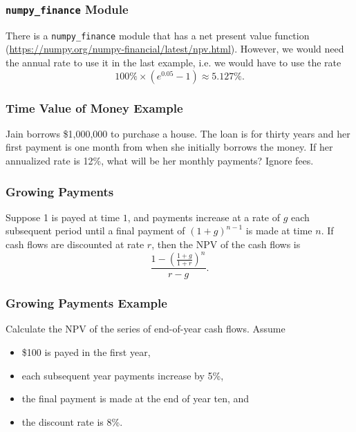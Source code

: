 \documentclass{beamer}
\begin{document}
\begin{frame}
\frametitle{\texttt{numpy\_finance} Module}

There is a \texttt{numpy\_finance} module that has a net present value function (\url{https://numpy.org/numpy-financial/latest/npv.html}). However, we would need the annual rate to use it in the last example, i.e. we would have to use the rate 
$$
100\% \times (e^{0.05} - 1) \approx 5.127\%.
$$
\end{frame}

\begin{frame}[t]
\frametitle{Time Value of Money Example}
\small
\begin{Example}
Jain borrows \$1,000,000 to purchase a house. The loan is for thirty years and her first payment is one month from when she initially borrows the money. If her annualized rate is 12\%, what will be her monthly payments? Ignore fees.
\end{Example}

\end{frame}

\begin{frame}
\frametitle{Growing Payments}
Suppose 1 is payed at time $1$, and payments increase at a rate of $g$ each subsequent period until a final payment of $(1 + g)^{n -1}$ is made at time $n$. If cash flows are discounted at rate $r$, then the NPV of the cash flows is
$$
\frac{1 - \left(\frac{1 + g}{1 + r}\right)^n}{r - g}.
$$
\end{frame}

\begin{frame}[t]
\frametitle{Growing Payments Example}
\tiny
\begin{Example}
Calculate the NPV of the series of end-of-year cash flows. Assume 
\begin{itemize}
\item \$100 is payed in the first year,
\item each subsequent year payments increase by 5\%, 
\item the final payment is made at the end of year ten, and
\item the discount rate is 8\%.
\end{itemize} 
\end{Example}

\end{frame}
\end{document}
